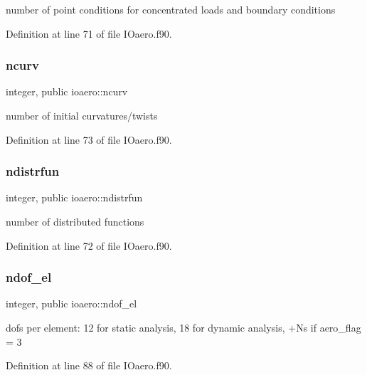 number of point conditions for concentrated loads and boundary conditions 



Definition at line 71 of file I\+Oaero.\+f90.

\mbox{\label{namespaceioaero_a34dabcb4bc1b4f260277297856ac3653}} 
\subsubsection{\texorpdfstring{ncurv}{ncurv}}
{\footnotesize\ttfamily integer, public ioaero\+::ncurv}



number of initial curvatures/twists 



Definition at line 73 of file I\+Oaero.\+f90.

\mbox{\label{namespaceioaero_a89e1f8f2d6913d23ef482a5788d2eba5}} 
\subsubsection{\texorpdfstring{ndistrfun}{ndistrfun}}
{\footnotesize\ttfamily integer, public ioaero\+::ndistrfun}



number of distributed functions 



Definition at line 72 of file I\+Oaero.\+f90.

\mbox{\label{namespaceioaero_a2b095b5cb5aab1f100d202c8004c9cb5}} 
\subsubsection{\texorpdfstring{ndof\+\_\+el}{ndof\_el}}
{\footnotesize\ttfamily integer, public ioaero\+::ndof\+\_\+el}



dofs per element\+: 12 for static analysis, 18 for dynamic analysis, +\+Ns if aero\+\_\+flag = 3 



Definition at line 88 of file I\+Oaero.\+f90.

